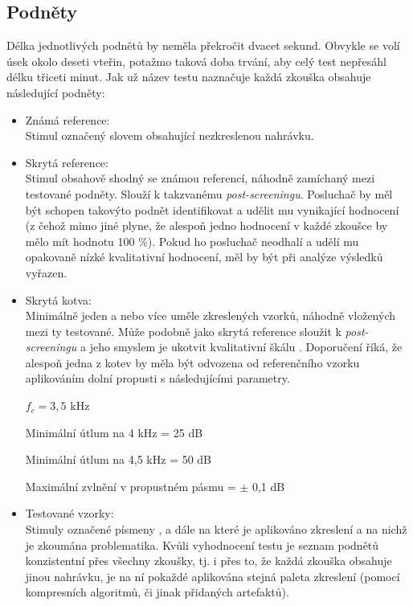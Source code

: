 \subsection{Podněty}
\label{subchapter:stimuli}

Délka jednotlivých podnětů by neměla překročit dvacet sekund. Obvykle se volí úsek okolo deseti vteřin, potažmo taková doba trvání, aby celý test nepřesáhl délku třiceti minut.
Jak už název testu naznačuje každá zkouška obsahuje následující podněty:

\begin{itemize}
    \item Známá reference:\\Stimul označený slovem  obsahující nezkreslenou nahrávku.
    
    \item Skrytá reference:\\Stimul obsahově shodný se známou referencí, náhodně zamíchaný mezi testované podněty. Slouží k takzvanému \textit{post-screeningu}. Posluchač by měl být schopen takovýto podnět identifikovat a udělit mu vynikající hodnocení (z čehož mimo jiné plyne, že alespoň jedno hodnocení v každé zkoušce by mělo mít hodnotu 100 \%). Pokud ho posluchač neodhalí a udělí mu opakovaně nízké kvalitativní hodnocení, měl by být při analýze výsledků vyřazen. 
    
    \item Skrytá kotva:\\ Minimálně jeden a nebo více uměle zkreslených vzorků, náhodně vložených mezi ty testované. Může podobně jako skrytá reference sloužit k \textit{post-screeningu} a jeho smyslem je ukotvit kvalitativní škálu . Doporučení \cite{itur:1534} říká, že alespoň jedna z kotev by měla být odvozena od referenčního vzorku aplikováním dolní propusti s následujícími parametry.
    
    \smallskip
    
    $f_c=3,5$ kHz
    
    Minimální útlum na 4 kHz = 25 dB
    
    Minimální útlum na 4,5 kHz = 50 dB
    
    Maximální zvlnění v propustném pásmu = $\pm$ 0,1 dB
    
    \smallskip
    
    \item Testované vzorky:\\
    Stimuly označené písmeny ,  a dále na které je aplikováno zkreslení a na nichž je zkoumána problematika. Kvůli vyhodnocení testu je seznam podnětů konzistentní přes všechny zkoušky, tj. i přes to, že každá zkouška obsahuje jinou nahrávku, je na ní pokaždé aplikována stejná paleta zkreslení (pomocí kompresních algoritmů, či jinak přidaných artefaktů).
    
\end{itemize}

